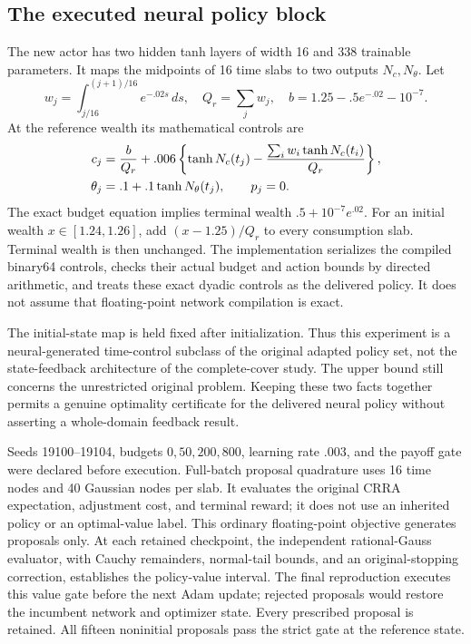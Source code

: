 \subsection{The executed neural policy block}
The new actor has two hidden tanh layers of width 16 and 338 trainable parameters. It maps the midpoints of 16 time slabs to two outputs $N_c,N_\theta$. Let
\[
 w_j=\int_{j/16}^{(j+1)/16}e^{-.02s}\,ds,\quad
 Q_r=\sum_jw_j,\quad b=1.25-.5e^{-.02}-10^{-7}.
\]
At the reference wealth its mathematical controls are
\begin{align}
 c_j&=\frac b{Q_r}+.006\left\{\tanh N_c(t_j)
       -\frac{\sum_iw_i\tanh N_c(t_i)}{Q_r}\right\},\label{eq:r19actor}\\
 \theta_j&=.1+.1\tanh N_\theta(t_j),\qquad p_j=0.\notag
\end{align}
The exact budget equation implies terminal wealth $.5+10^{-7}e^{.02}$. For an initial wealth $x\in[1.24,1.26]$, add $(x-1.25)/Q_r$ to every consumption slab. Terminal wealth is then unchanged. The implementation serializes the compiled binary64 controls, checks their actual budget and action bounds by directed arithmetic, and treats these exact dyadic controls as the delivered policy. It does not assume that floating-point network compilation is exact.

The initial-state map is held fixed after initialization. Thus this experiment is a neural-generated time-control subclass of the original adapted policy set, not the state-feedback architecture of the complete-cover study. The upper bound still concerns the unrestricted original problem. Keeping these two facts together permits a genuine optimality certificate for the delivered neural policy without asserting a whole-domain feedback result.

Seeds 19100--19104, budgets $0,50,200,800$, learning rate $.003$, and the payoff gate were declared before execution. Full-batch proposal quadrature uses 16 time nodes and 40 Gaussian nodes per slab. It evaluates the original CRRA expectation, adjustment cost, and terminal reward; it does not use an inherited policy or an optimal-value label. This ordinary floating-point objective generates proposals only. At each retained checkpoint, the independent rational-Gauss evaluator, with Cauchy remainders, normal-tail bounds, and an original-stopping correction, establishes the policy-value interval. The final reproduction executes this value gate before the next Adam update; rejected proposals would restore the incumbent network and optimizer state. Every prescribed proposal is retained. All fifteen noninitial proposals pass the strict gate at the reference state.

